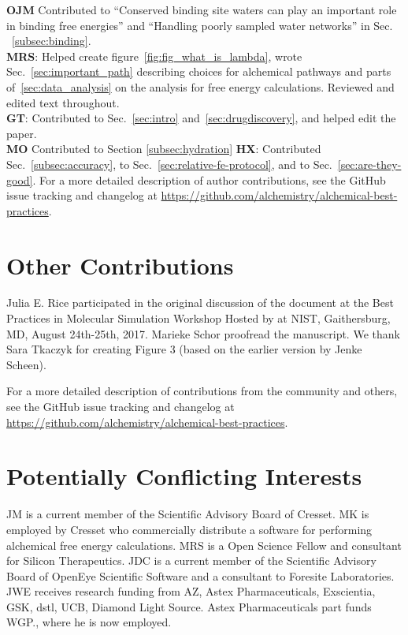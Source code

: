 \documentclass[9pt,bestpractices]{livecoms}
\newcommand{\githubrepository}{\url{https://github.com/alchemistry/alchemical-best-practices}} %
\begin{document}
\textbf{OJM} Contributed to ``Conserved binding site waters can play an important role in binding free energies'' and ``Handling poorly sampled water networks'' in Sec. ~\ref{subsec:binding}.\\
\textbf{MRS}: Helped create figure~\ref{fig:fig_what_is_lambda}, wrote Sec.~\ref{sec:important_path} describing choices for alchemical pathways and parts of~\ref{sec:data_analysis} on the analysis for free energy calculations. Reviewed and edited text throughout.\\
\textbf{GT}: Contributed to Sec.~\ref{sec:intro} and~\ref{sec:drugdiscovery}, and helped edit the paper.\\
\textbf{MO} Contributed to Section \ref{subsec:hydration}
\textbf{HX}: Contributed Sec.~\ref{subsec:accuracy}, to Sec.~\ref{sec:relative-fe-protocol}, and to Sec.~\ref{sec:are-they-good}.
For a more detailed description of author contributions,
see the GitHub issue tracking and changelog at \githubrepository.

\section*{Other Contributions}
%
Julia E. Rice participated in the original discussion of the document at the Best Practices in Molecular Simulation Workshop Hosted by at NIST, Gaithersburg, MD, August 24th-25th, 2017.
Marieke Schor proofread the manuscript. 
We thank Sara Tkaczyk for creating Figure 3 (based on the earlier version by Jenke Scheen).

For a more detailed description of contributions from the community and others, 
see the GitHub issue tracking and changelog at \githubrepository.


\section*{Potentially Conflicting Interests}
JM is a current member of the Scientific Advisory Board of Cresset. 
MK is employed by Cresset who commercially distribute a software for performing alchemical free energy calculations. MRS is a Open Science Fellow and consultant for Silicon Therapeutics.
JDC is a current member of the Scientific Advisory Board of OpenEye Scientific Software and a consultant to Foresite Laboratories.
JWE receives research funding from AZ, Astex Pharmaceuticals, Exscientia, GSK, dstl, UCB, Diamond Light Source. Astex Pharmaceuticals part funds WGP., where he is now employed.
\end{document}
